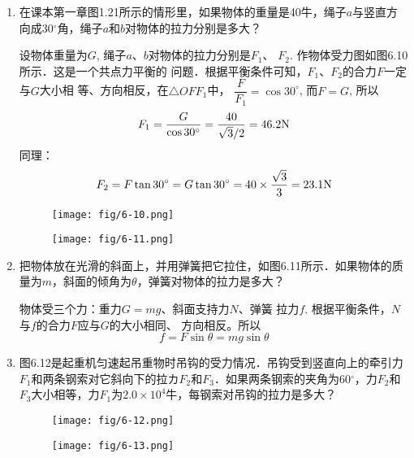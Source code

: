\begin{enumerate}
    \item 在课本第一章图1.21所示的情形里，如果物体的重量是40牛，绳子$a$与竖直方向成30$^\circ$角，绳子$a$和$b$对物体的拉力分别是多大？

    \begin{solution}
        设物体重量为$G$, 绳子$a$、$b$对物体的拉力分别是$F_1$、
        $F_2$. 作物体受力图如图6.10所示．这是一个共点力平衡的
        问题．根据平衡条件可知，$F_1$、$F_2$的合力$F$一定与$G$大小相
        等、方向相反，在$\triangle OFF_1$中，
        $\dfrac{F}{F_1}=\cos30^{\circ}$, 而$F=G$, 所以
\[F_1=\frac{G}{\cos 30^{\circ}}=\frac{40}{\sqrt{3}/2}=46.2{\rm N}\]
同理：
\[F_2=F\tan 30^{\circ}=G\tan 30^{\circ}=40\times \frac{\sqrt{3}}{3}=23.1{\rm N}\]    
    \end{solution}

    \begin{figure}[htp]\centering
        \begin{minipage}[t]{0.48\textwidth}
        \centering
    \texttt{[image: fig/6-10.png]}
        \caption{}
        \end{minipage}
        \begin{minipage}[t]{0.48\textwidth}
        \centering
    \texttt{[image: fig/6-11.png]}
        \caption{}
        \end{minipage}
        \end{figure}

    \item 把物体放在光滑的斜面上，并用弹簧把它拉住，如图6.11所示．如果物体的质量为$m$，斜面的倾角为$\theta$，弹簧对物体的拉力是多大？


    \begin{solution}
        物体受三个力：重力$G=mg$、斜面支持力$N$、弹簧
        拉力$f$. 根据平衡条件，$N$与$f$的合力$F$应与$G$的大小相同、
        方向相反。所以
     \[   f=F\sin\theta= mg\sin \theta\]
    \end{solution}


    \item 图6.12是起重机匀速起吊重物时吊钩的受力情况．吊钩受到竖直向上的牵引力$F_1$和两条钢索对它斜向下的拉カ$F_2$和$F_3$．如果两条钢索的夹角为60$^\circ$，力$F_2$和$F_3$大小相等，力$F_1$为$2.0\times 10^4$牛，每钢索对吊钩的拉力是多大？

\begin{figure}[htp]\centering
\begin{minipage}[t]{0.48\textwidth}
\centering\texttt{[image: fig/6-12.png]}
\caption{}
\end{minipage}
\begin{minipage}[t]{0.48\textwidth}
\centering\texttt{[image: fig/6-13.png]}
\caption{}
\end{minipage}
\end{figure}


\end{enumerate}
